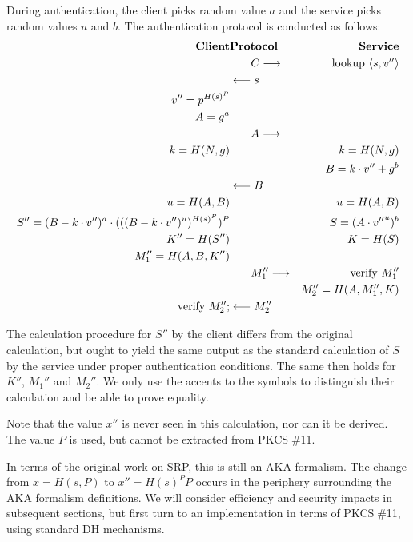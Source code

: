 \documentclass[a4paper,11pt]{article}
\def\pkcs11{PKCS$\;$\#11\xspace}
\def\tol#1{\longleftarrow\strut{}#1\strut\phantom{\longrightarrow}}
\def\tor#1{\phantom{\longleftarrow\strut}#1\strut\longrightarrow}
\begin{document}
During authentication, the client picks random value $a$ and the service picks random values $u$ and $b$.  The authentication protocol is conducted as follows:
%
\begin{eqnarray*}
\textbf{Client}&\textbf{Protocol}&\textbf{Service}\\
&\tor{C}&\textrm{lookup $\langle s,v''\rangle$}\\
&\tol{s}&\\
v''=p^{{H(s)}^P}&&\\
A=g^a&&\\
&\tor{A}&\\
k=H(N,g)&&k=H(N,g)\\
&&B=k\cdot v''+g^b\\
&\tol{B}&\\
u=H(A,B)&&u=H(A,B)\\
S''=(B-k\cdot v'')^a\cdot (((B-k\cdot v'')^u)^{{H(s)}^P})^P && S=(A\cdot {v''}^u)^b\\
K''=H(S'')&&K=H(S)\\
M_1''=H(A,B,K'')&&\\
&\tor{M_1''}&\textrm{verify $M_1''$}\\
&&M_2''=H(A,M_1'',K)\\
\textrm{verify $M_2'';$}&\tol{M_2''}&
\end{eqnarray*}

The calculation procedure for $S''$ by the client differs from the original calculation, but ought to yield the same output as the standard calculation of $S$ by the service under proper authentication conditions.  The same then holds for $K''$, $M_1''$ and $M_2''$.  We only use the accents to the symbols to distinguish their calculation and be able to prove equality.

Note that the value $x''$ is never seen in this calculation, nor can it be derived.  The value $P$ is used, but cannot be extracted from \pkcs11.

In terms of the original work on SRP, this is still an AKA formalism.  The change from $x=H(s,P)$ to $x''={H(s)}^P P$ occurs in the periphery surrounding the AKA formalism definitions.  We will consider efficiency and security impacts in subsequent sections, but first turn to an implementation in terms of \pkcs11, using standard DH mechanisms.
\end{document}
